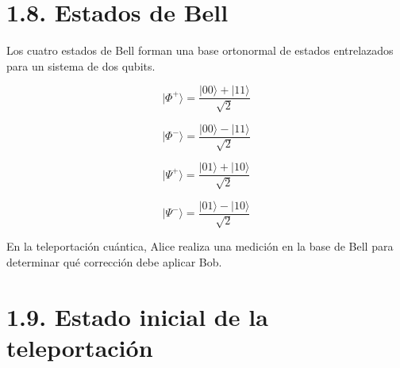 \documentclass{afitdefense}
\begin{document}
\section{1.8. Estados de Bell}

\begin{Center}

\centering

Los cuatro estados de Bell
forman una base ortonormal de estados
entrelazados para un sistema de dos qubits.\\

\begin{minipage}[c]{0.47\textwidth}
\centering

\[
\boxed{
|\Phi^{+}\rangle =
\frac{|00\rangle+|11\rangle}{\sqrt{2}}
}
\]

\[
\boxed{
|\Phi^{-}\rangle =
\frac{|00\rangle-|11\rangle}{\sqrt{2}}
}
\]

\end{minipage}
\hfill
\begin{minipage}[c]{0.47\textwidth}
\centering

\[
\boxed{
|\Psi^{+}\rangle =
\frac{|01\rangle+|10\rangle}{\sqrt{2}}
}
\]

\[
\boxed{
|\Psi^{-}\rangle =
\frac{|01\rangle-|10\rangle}{\sqrt{2}}
}
\]

\end{minipage}

\vspace{0.7cm}

\small
En la teleportación cuántica,
Alice realiza una medición en la base de Bell
para determinar qué corrección debe aplicar Bob.

\end{Center}


\section{1.9. Estado inicial de la teleportación}
\end{document}
